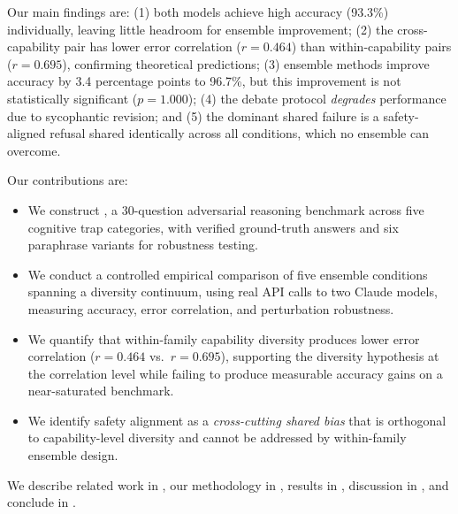 Our main findings are:
(1) both models achieve high accuracy (93.3\%) individually,
leaving little headroom for ensemble improvement;
(2) the cross-capability pair has lower error correlation ($r{=}0.464$)
than within-capability pairs ($r{=}0.695$), confirming theoretical predictions;
(3) ensemble methods improve accuracy by 3.4 percentage points to 96.7\%,
but this improvement is not statistically significant ($p{=}1.000$);
(4) the debate protocol \emph{degrades} performance due to sycophantic revision;
and (5) the dominant shared failure is a safety-aligned refusal shared
identically across all conditions, which no ensemble can overcome.

Our contributions are:

\begin{itemize}[leftmargin=*,itemsep=0pt,topsep=0pt]
    \item We construct \advbench, a 30-question adversarial reasoning benchmark
          across five cognitive trap categories, with verified ground-truth answers
          and six paraphrase variants for robustness testing.
    \item We conduct a controlled empirical comparison of five ensemble conditions
          spanning a diversity continuum, using real API calls to two Claude models,
          measuring accuracy, error correlation, and perturbation robustness.
    \item We quantify that within-family capability diversity produces lower
          error correlation ($r{=}0.464$ vs.\ $r{=}0.695$), supporting the
          diversity hypothesis at the correlation level while failing to produce
          measurable accuracy gains on a near-saturated benchmark.
    \item We identify safety alignment as a \emph{cross-cutting shared bias}
          that is orthogonal to capability-level diversity and cannot be
          addressed by within-family ensemble design.
\end{itemize}

We describe related work in , our methodology in ,
results in , discussion in ,
and conclude in .
